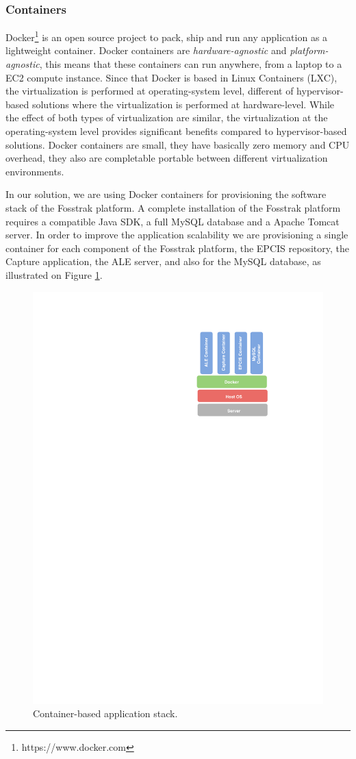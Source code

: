 \subsubsection{Containers}
\label{subs:containers}
Docker\footnote{https://www.docker.com} is an open source project to pack, ship and run any application
as a lightweight container. Docker containers are \textit{hardware-agnostic} and \textit{platform-agnostic},
this means that these containers can run anywhere, from a laptop to a EC2 compute instance. Since that Docker
is based in Linux Containers (LXC), the virtualization is performed at operating-system level, different of
hypervisor-based solutions where the virtualization is performed at hardware-level. While the effect of both
types of virtualization are similar, the virtualization at the operating-system level provides significant
benefits compared to hypervisor-based solutions\cite{Merkel}. Docker containers are small, they have basically zero
memory and CPU overhead, they also are completable portable between different virtualization environments.

In our solution, we are using Docker containers for provisioning the software stack of the Fosstrak platform.
A complete installation of the Fosstrak platform requires a compatible Java SDK, a full MySQL database and
a Apache Tomcat server. In order to improve the application scalability we are provisioning a single container
for each component of the Fosstrak platform, the EPCIS repository, the Capture application, the ALE server,
and also for the MySQL database, as illustrated on Figure \ref{fig:docker_stack}.

\begin{figure}[!h]
  \centering
  \includegraphics[width=.45\textwidth]{images/docker-stack}
  \caption{Container-based application stack.}
  \label{fig:docker_stack}
\end{figure}


